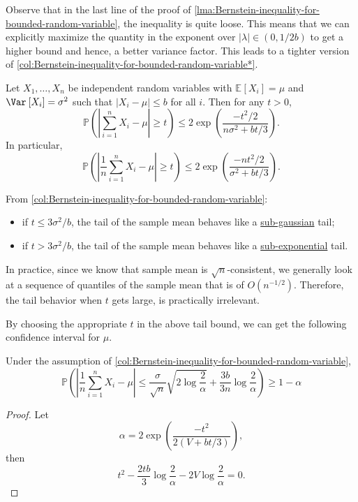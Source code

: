 \begin{remark}
	Observe that in the last line of the proof of \autoref{lma:Bernstein-inequality-for-bounded-random-variable}, the inequality is quite loose. This means that we can explicitly maximize the quantity in the exponent over \(\vert \lambda \vert \in (0 , 1 / 2b)\) to get a higher bound and hence, a better variance factor. This leads to a tighter version of \autoref{col:Bernstein-inequality-for-bounded-random-variable*}.
\end{remark}

\begin{corollary}\label{col:Bernstein-inequality-for-bounded-random-variable}
	Let \(X_1, \dots , X_n\) be independent random variables with \(\mathbb{E}_{}\left[X_i \right] = \mu \) and \(\Var_{}\left[X_i \right] = \sigma ^{2}\) such that \(\vert X_i - \mu \vert \leq b\) for all \(i\). Then for any \(t > 0\),
	\[
		\mathbb{P} \left( \left\vert \sum_{i=1}^{n} X_i - \mu \right\vert \geq t \right) \leq 2 \exp \left( \frac{- t^2 / 2}{n \sigma ^{2} + bt / 3 } \right) .
	\]
	In particular,
	\[
		\mathbb{P} \left( \left\vert \frac{1}{n}\sum_{i=1}^{n} X_i - \mu \right\vert \geq t \right) \leq 2 \exp \left( \frac{- nt^2 / 2}{\sigma ^{2} + bt / 3} \right).
	\]
\end{corollary}

From \autoref{col:Bernstein-inequality-for-bounded-random-variable}:
\begin{itemize}
	\item if \(t \leq 3 \sigma ^{2} / b\), the tail of the sample mean behaves like a \hyperref[def:sub-gaussian]{sub-gaussian} tail;
	\item if \(t > 3\sigma ^{2} / b\), the tail of the sample mean behaves like a \hyperref[def:sub-exponential]{sub-exponential} tail.
\end{itemize}

\begin{remark}
	In practice, since we know that sample mean is \(\sqrt{n} \)-consistent, we generally look at a sequence of quantiles of the sample mean that is of \(O(n^{-1 / 2})\). Therefore, the tail behavior when \(t\) gets large, is practically irrelevant.
\end{remark}

By choosing the appropriate \(t\) in the above tail bound, we can get the following confidence interval for \(\mu \).

\begin{corollary}\label{col:Bernstein-confidence-interval}
	Under the assumption of \autoref{col:Bernstein-inequality-for-bounded-random-variable},
	\[
		\mathbb{P} \left( \left\vert \frac{1}{n} \sum_{i=1}^{n} X_i - \mu  \right\vert \leq \frac{\sigma}{\sqrt{n} } \sqrt{2 \log \frac{2}{\alpha }} + \frac{3b}{3n} \log \frac{2}{\alpha } \right) \geq 1 - \alpha
	\]
\end{corollary}
\begin{proof}
	Let
	\[
		\alpha = 2 \exp \left( \frac{- t^2}{2(V + bt / 3)} \right),
	\]
	then
	\[
		t^2 - \frac{2tb}{3}\log \frac{2}{\alpha } - 2 V \log \frac{2}{\alpha } = 0.
	\]
\end{proof}


